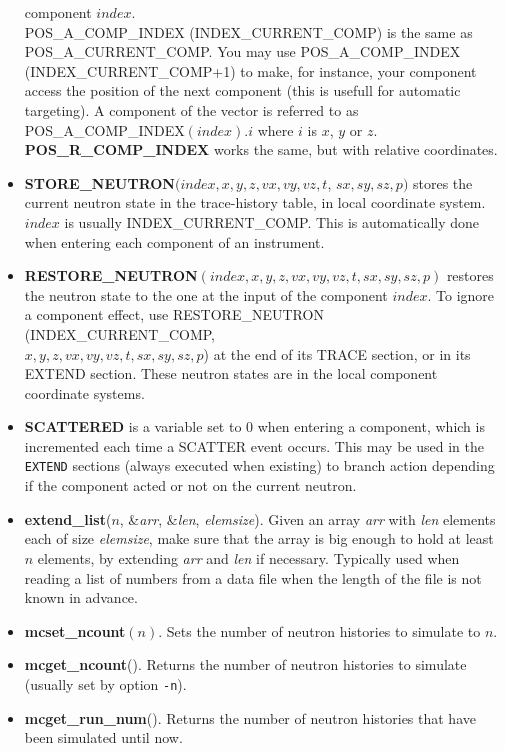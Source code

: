 \begin{itemize}
  component $index$. \\
  POS\_A\_COMP\_INDEX (INDEX\_CURRENT\_COMP) is the same as \\
  POS\_A\_CURRENT\_COMP. You may use
  POS\_A\_COMP\_INDEX \\ (INDEX\_CURRENT\_COMP+1) to make, for instance, your
  component access the position of the next component (this is usefull for
  automatic targeting).  A component of the vector is referred to as \\
  POS\_A\_COMP\_INDEX$(index).i$ where $i$ is $x$, $y$ or $z$. {\bf
  POS\_R\_COMP\_INDEX} works the same, but with relative coordinates. 
\item {\bf STORE\_NEUTRON}$(index, x, y, z, vx, vy, vz, t$, $sx, sy,
sz, p)$ stores the current neutron state in the trace-history table,
in local coordinate system. $index$ is usually INDEX\_CURRENT\_COMP.
This is automatically done when entering each component of an
instrument.
\item {\bf RESTORE\_NEUTRON}$(index, x, y, z, vx, vy, vz, t, sx, sy,
sz, p)$ restores the neutron state to the one at the input of the
component $index$. To ignore a component effect, use
RESTORE\_NEUTRON (INDEX\_CURRENT\_COMP, \\ 
$x, y, z, vx, vy, vz, t,
sx, sy, sz, p$) at the end of its TRACE section, or in its EXTEND
section. These neutron states are in the local component coordinate
systems.
\item {\bf SCATTERED} is a variable set to 0 when entering
  a component, which is incremented each time a SCATTER event occurs.
  This may be used in the \verb+EXTEND+ sections (always executed when
  existing) to branch
  action depending if the component acted or not on the current neutron.
\item {\bf extend\_list}($n$, \&\textit{arr}, \&\textit{len},
  \textit{elemsize}). Given an array \textit{arr} with \textit{len}
  elements each of size \textit{elemsize}, make sure that the array is
  big enough to hold at least $n$ elements, by extending \textit{arr}
  and \textit{len} if necessary. Typically used when reading a list of
  numbers from a data file when the length of the file is not known in advance.
\item {\bf mcset\_ncount}$(n)$. Sets the number of neutron histories to simulate to $n$.
\item {\bf mcget\_ncount}(). Returns the number of neutron histories to simulate (usually set by option \verb+-n+).
\item {\bf mcget\_run\_num}(). Returns the number of neutron histories that have been simulated until now.
\end{itemize}

